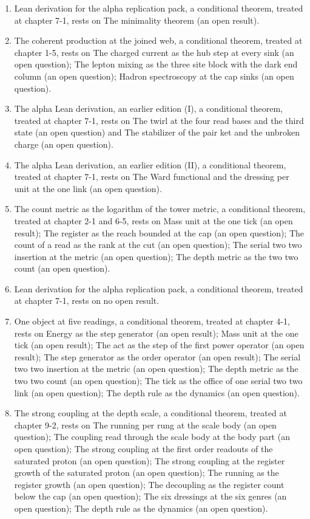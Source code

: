 \begin{enumerate}
\item Lean derivation for the alpha replication pack, a conditional theorem, treated at chapter 7-1, rests on The minimality theorem (an open result).
\item The coherent production at the joined web, a conditional theorem, treated at chapter 1-5, rests on The charged current as the hub step at every sink (an open question); The lepton mixing as the three site block with the dark end column (an open question); Hadron spectroscopy at the cap sinks (an open question).
\item The alpha Lean derivation, an earlier edition (I), a conditional theorem, treated at chapter 7-1, rests on The twirl at the four read bases and the third state (an open question) and The stabilizer of the pair ket and the unbroken charge (an open question).
\item The alpha Lean derivation, an earlier edition (II), a conditional theorem, treated at chapter 7-1, rests on The Ward functional and the dressing per unit at the one link (an open question).
\item The count metric as the logarithm of the tower metric, a conditional theorem, treated at chapter 2-1 and 6-5, rests on Mass unit at the one tick (an open result); The register as the reach bounded at the cap (an open question); The count of a read as the rank at the cut (an open question); The serial two two insertion at the metric (an open question); The depth metric as the two two count (an open question).
\item Lean derivation for the alpha replication pack, a conditional theorem, treated at chapter 7-1, rests on no open result.
\item One object at five readings, a conditional theorem, treated at chapter 4-1, rests on Energy as the step generator (an open result); Mass unit at the one tick (an open result); The act as the step of the first power operator (an open result); The step generator as the order operator (an open result); The serial two two insertion at the metric (an open question); The depth metric as the two two count (an open question); The tick as the office of one serial two two link (an open question); The depth rule as the dynamics (an open question).
\item The strong coupling at the depth scale, a conditional theorem, treated at chapter 9-2, rests on The running per rung at the scale body (an open question); The coupling read through the scale body at the body part (an open question); The strong coupling at the first order readouts of the saturated proton (an open question); The strong coupling at the register growth of the saturated proton (an open question); The running as the register growth (an open question); The decoupling as the register count below the cap (an open question); The six dressings at the six genres (an open question); The depth rule as the dynamics (an open question).
\end{enumerate}
